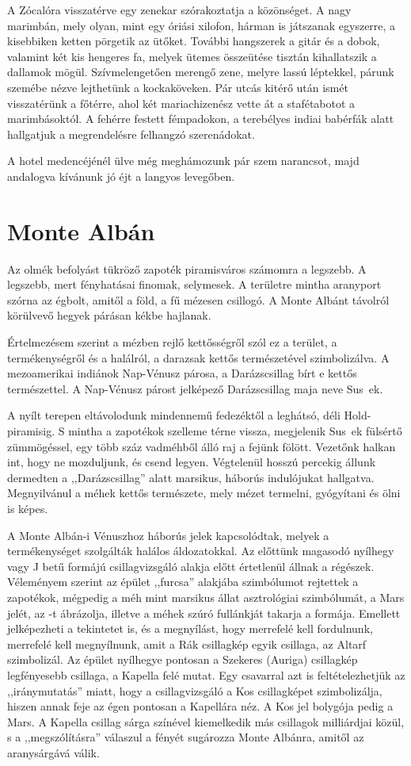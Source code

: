 A Zócalóra visszatérve egy zenekar szórakoztatja a közönséget.
A nagy marimbán, mely olyan, mint egy óriási xilofon, hárman is
játszanak egyszerre, a kisebbiken ketten pörgetik az ütőket. További
hangszerek a gitár és a dobok, valamint két kis hengeres fa, melyek
ütemes összeütése tisztán kihallatszik a dallamok mögül. Szívmelengetően
merengő zene, melyre lassú léptekkel, párunk szemébe nézve
lejthetünk a kockaköveken. Pár utcás kitérő után ismét visszatérünk
a főtérre, ahol két mariachizenész vette át a stafétabotot a marimbásoktól.
A fehérre festett fémpadokon, a terebélyes indiai babérfák alatt
hallgatjuk a megrendelésre felhangzó szerenádokat.

A hotel medencéjénél ülve még meghámozunk pár szem narancsot,
majd andalogva kívánunk jó éjt a langyos levegőben.

\section{Monte Albán}

Az olmék befolyást tükröző zapoték piramisváros számomra a legszebb.
A legszebb, mert fényhatásai finomak, selymesek. A területre
mintha aranyport szórna az égbolt, amitől a föld, a fű mézesen csillogó.
A Monte Albánt távolról körülvevő hegyek párásan kékbe hajlanak.

Értelmezésem szerint a mézben rejlő kettősségről szól ez a terület,
a termékenységről és a halálról, a darazsak kettős természetével
szimbolizálva. A mezoamerikai indiánok Nap-Vénusz párosa, a Darázscsillag
bírt e kettős természettel. A Nap-Vénusz párost jelképező
Darázscsillag maja neve Sus~ek.

A nyílt terepen eltávolodunk mindennemű fedezéktől a leghátsó,
déli Hold-piramisig. S mintha a zapotékok szelleme térne vissza,
megjelenik Sus~ek fülsértő zümmögéssel, egy több száz vadméhből
álló raj a fejünk fölött. Vezetőnk halkan int, hogy ne mozduljunk, és
csend legyen. Végtelenül hosszú percekig állunk dermedten a ,,Darázscsillag''
alatt marsikus, háborús indulójukat hallgatva. Megnyilvánul
a méhek kettős természete, mely mézet termelni, gyógyítani és
ölni is képes.

A Monte Albán-i Vénuszhoz háborús jelek kapcsolódtak, melyek
a termékenységet szolgálták halálos áldozatokkal. Az előttünk magasodó
nyílhegy vagy J betű formájú csillagvizsgáló alakja előtt értetlenül
állnak a régészek. Véleményem szerint az épület ,,furcsa'' alakjába
szimbólumot rejtettek a zapotékok, mégpedig a méh mint marsikus
állat asztrológiai szimbólumát, a Mars jelét, az \male-t ábrázolja, illetve
a méhek szúró fullánkját takarja a formája. Emellett jelképezheti a
tekintetet is, és a megnyílást, hogy merrefelé kell fordulnunk, merrefelé
kell megnyílnunk, amit a Rák csillagkép egyik csillaga, az Altarf
szimbolizál. Az épület nyílhegye pontosan a Szekeres (Auriga) csillagkép
legfényesebb csillaga, a Kapella felé mutat. Egy csavarral azt is
feltételezhetjük az ,,iránymutatás'' miatt, hogy a csillagvizsgáló a Kos
csillagképet szimbolizálja, hiszen annak feje az égen pontosan a Kapellára
néz. A Kos jel bolygója pedig a Mars. A Kapella csillag sárga színével
kiemelkedik más csillagok milliárdjai közül, s a ,,megszólításra''
válaszul a fényét sugározza Monte Albánra, amitől az aranysárgává válik.

